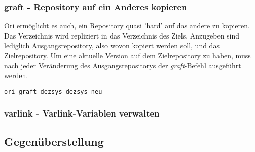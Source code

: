 \subsubsection{graft - Repository auf ein Anderes kopieren}
\label{subsubsec:graft - Repository auf ein Anderes kopieren}
Ori ermöglicht es auch, ein Repository quasi 'hard' auf das andere zu kopieren. Das Verzeichnis wird repliziert in das Verzeichnis des Ziels. Anzugeben sind lediglich Ausgangsrepository, also wovon kopiert werden soll, und das Zielrepository. Um eine aktuelle Version auf dem Zielrepository zu haben, muss nach jeder Veränderung des Ausgangsrepositorys der \textit{graft}-Befehl ausgeführt werden.
\begin{lstlisting}[frame=single, caption=graft]
ori graft dezsys dezsys-neu
\end{lstlisting}

\subsubsection{varlink - Varlink-Variablen verwalten}
\label{subsubsec:varlink - Varlink-Variablen verwalten}

\subsection{Gegenüberstellung}
\label{subsec:Gegenüberstellung}

%
%
%
